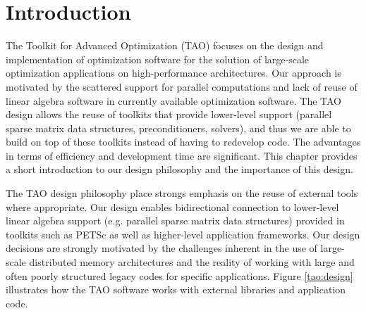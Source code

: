 \chapter{Introduction}
\label{chapter:introduction}


The Toolkit for Advanced Optimization (TAO) focuses on the design and
implementation of optimization software for the
solution of large-scale optimization applications on high-performance
architectures.  Our approach is motivated by the scattered support for
parallel computations and lack of reuse of linear algebra software in
currently available optimization software.  The TAO design allows the
reuse of toolkits that provide lower-level support (parallel sparse
matrix data structures, preconditioners, solvers), and thus we are
able to build on top of these toolkits instead of having to redevelop
code. The advantages in terms of efficiency and development time are
significant.  This chapter provides a short introduction to our design 
philosophy and the importance of this design.



The TAO design philosophy place strongs emphasis on the reuse of
external tools where appropriate.  Our design enables bidirectional
connection to lower-level linear algebra support (e.g. parallel sparse
matrix data structures) provided in toolkits such as PETSc
\cite{petsc,petsc-user-ref,petsc-web-page}
as well as higher-level application
frameworks.  Our design decisions are strongly motivated by the
challenges inherent in the use of large-scale distributed memory
architectures and the reality of working with large and often poorly
structured legacy codes for specific applications.  Figure
\ref{tao:design} illustrates how the TAO software works with external
libraries and application code.

